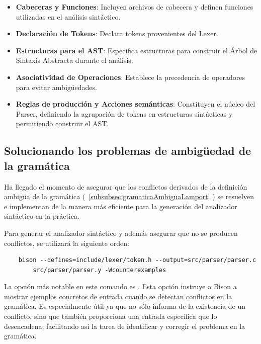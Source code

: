 \begin{itemize}
    \item \textbf{Cabeceras y Funciones}: Incluyen archivos de cabecera y definen funciones utilizadas en el análisis sintáctico.
    \item \textbf{Declaración de Tokens}: Declara tokens provenientes del Lexer.
    \item \textbf{Estructuras para el AST}: Especifica estructuras para construir el Árbol de Sintaxis Abstracta durante el análisis.
    \item \textbf{Asociatividad de Operaciones}: Establece la precedencia de operadores para evitar ambigüedades.
    \item \textbf{Reglas de producción y Acciones semánticas}: Constituyen el núcleo del Parser, definiendo la agrupación de tokens en estructuras sintácticas y permitiendo construir el AST.
\end{itemize}

\subsection{Solucionando los problemas de ambigüedad de la gramática}
Ha llegado el momento de asegurar que los conflictos derivados de la definición ambigüa de la gramática (~\ref{subsubsec:gramaticaAmbiguaLamport} ) se resuelven e implementan de la manera más eficiente para la generación del analizador sintáctico en la práctica.


\noindent
Para generar el analizador sintáctico y además asegurar que no se producen conflictos, se utilizará la siguiente orden:
\begin{verbatim}
    bison --defines=include/lexer/token.h --output=src/parser/parser.c 
        src/parser/parser.y -Wcounterexamples
\end{verbatim}

La opción más notable en este comando es . Esta opción instruye a Bison a mostrar ejemplos concretos de entrada cuando se detectan conflictos en la gramática. Es especialmente útil ya que no sólo informa de la existencia de un conflicto, sino que también proporciona una entrada específica que lo desencadena, facilitando así la tarea de identificar y corregir el problema en la gramática.

\newpage

